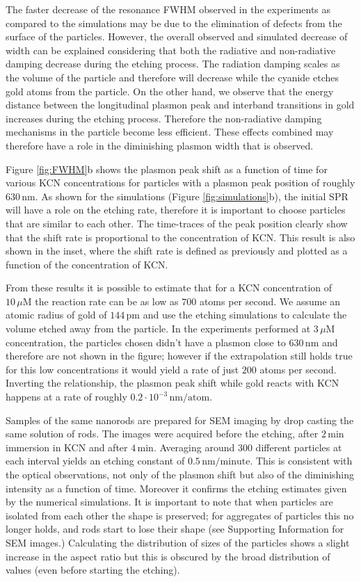 \documentclass[a4paper,oneside,onecolumn]{article}
\newcommand{\nm}{\ensuremath{\,\textrm{nm}}}
\newcommand{\uM}{\ensuremath{\,\mu\textrm{M}}}
\begin{document}
The faster decrease of the resonance FWHM observed in the experiments as
compared to the simulations may be due to the elimination of defects from the
surface of the particles. However, the overall observed and simulated decrease
of width can be explained considering that both the radiative and non-radiative
damping decrease during the etching process. The radiation damping scales as the
volume of the particle\cite{Wokaun1982} and therefore will decrease while the
cyanide etches gold atoms from the particle.
On the other hand, we observe that the energy distance between the longitudinal
plasmon peak and interband transitions in gold increases during the etching
process. Therefore the non-radiative damping mechanisms in the particle become
less efficient\cite{Sonnichsen2002}. These effects combined may therefore have a
role in the diminishing plasmon width that is observed.

Figure \ref{fig:FWHM}b shows the plasmon peak shift as a function of time for
various KCN concentrations for particles with a plasmon peak position of
roughly $630\nm$. As shown for the simulations (Figure
\ref{fig:simulations}b), the initial SPR will have a role on the etching rate,
therefore it is important to choose particles that are similar to each other.
The time-traces of the peak position clearly show that the shift rate is
proportional to the concentration of KCN. This result is also shown in the
inset, where the shift rate is defined as previously and plotted as a function
of the concentration of KCN.

From these results it is possible to estimate that for a KCN concentration of
$10\uM$ the reaction rate can be as low as $700$ atoms per second. We assume an
atomic radius of gold of $144\,\textrm{pm}$\cite{Pauling1947} and use the
etching simulations to calculate the volume etched away from the particle. In the experiments performed
at $3\uM$ concentration, the particles chosen didn't have a plasmon close to
$630\nm$ and therefore are not shown in the figure; however if the extrapolation
still holds true for this low concentrations it would yield a rate of just $200$
atoms per second. Inverting the relationship, the plasmon peak shift while gold
reacts with KCN happens at a rate of roughly $0.2\cdot
10^{-3}\,\textrm{nm}/\textrm{atom}$.

Samples of the same nanorods are prepared for SEM imaging by drop casting the
same solution of rods. The images were acquired before the etching, after
$2\,\textrm{min}$ immersion in KCN and after $4\,\textrm{min}$. Averaging
around $300$ different particles at each interval yields an etching constant
of $0.5\nm/\textrm{minute}$. This is consistent with the optical observations,
not only of the plasmon shift but also of the diminishing intensity as a
function of time. Moreover it confirms the etching estimates given by the
numerical simulations. It is important to note that when particles are isolated
from each other the shape is preserved; for aggregates of particles this no
longer holds, and rods start to lose their shape (see Supporting Information
for SEM images.) Calculating the distribution of sizes of the particles shows
a slight increase in the aspect ratio but this is obscured by the broad
distribution of values (even before starting the etching).
\end{document}
